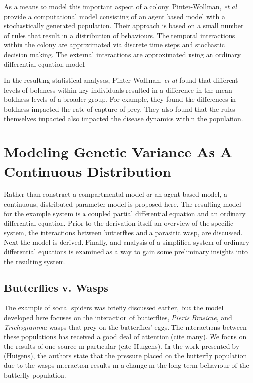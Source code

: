 \documentclass[12pt]{article}
\begin{document}
As a means to model this important aspect of a colony, Pinter-Wollman,
\textit{et al} provide a computational model consisting of an agent
based model with a stochastically generated population. Their approach
is based on a small number of rules that result in a distribution of
behaviours. The temporal interactions within the colony are
approximated via discrete time steps and stochastic decision
making. The external interactions are approximated using an
ordinary differential equation model.

In the resulting statistical analyses, Pinter-Wollman, \textit{et al}
found that different levels of boldness within key individuals
resulted in a difference in the mean boldness levels of a broader
group. For example, they found the differences in boldness impacted
the rate of capture of prey. They also found that the rules themselves
impacted also impacted the disease dynamics within the population.


\section{Modeling Genetic Variance As A Continuous Distribution}

Rather than construct a compartmental model or an agent based model, a
continuous, distributed parameter model is proposed here. The
resulting model for the example system is a coupled partial
differential equation and an ordinary differential equation. Prior to
the derivation itself an overview of the specific system, the
interactions between butterflies and a parasitic wasp, are
discussed. Next the model is derived. Finally, and analysis of a
simplified system of ordinary differential equations is examined as a
way to gain some preliminary insights into the resulting system.

\subsection{Butterflies v. Wasps}

The example of social spiders was briefly discussed earlier, but the
model developed here focuses on the interaction of butterflies,
\textit{Pieris Brasicae}, and \textit{Trichogramma} wasps that prey on
the butterflies' eggs. The interactions between these populations has
received a good deal of attention (cite many). We focus on the results
of one source in particular (cite Huigens). In the work presented by
(Huigens), the authors state that the pressure placed on the butterfly
population due to the wasps interaction results in a change in the
long term behaviour of the butterfly population.
\end{document}
